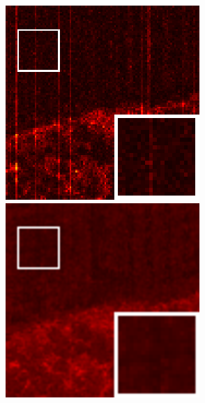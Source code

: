 \begin{figure}[t]
\begin{center}
\begin{minipage}{0.15\hsize}
		\end{minipage}
		\begin{minipage}{0.15\hsize}
			\centerline{\includegraphics[width=\hsize]{./fig_supplement/SAM_map_color_woboundary/Beltsville/sam_map_TPTV.eps}} %
		\end{minipage}
		\begin{minipage}{0.15\hsize}
			\centerline{\includegraphics[width=\hsize]{./fig_supplement/SAM_map_color_woboundary/Beltsville/sam_map_QRNN3D.eps}} %

\end{minipage}
\end{center}
\end{figure}
